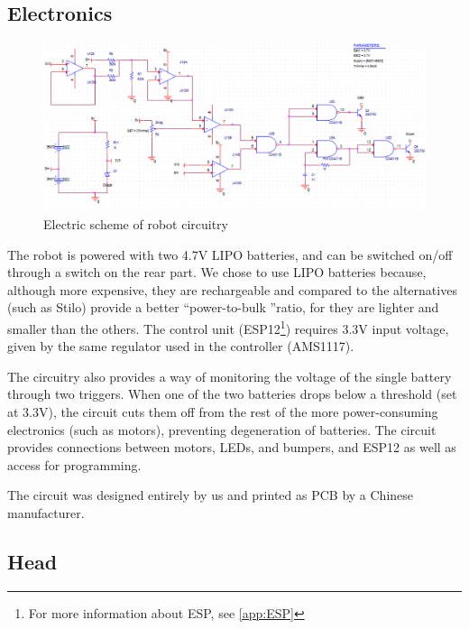 \documentclass[a4paper,twoside]{book}
\begin{document}
\subsection{Electronics}

\begin{figure}[h]
\includegraphics[width=\textwidth]{img/ProgettoCircuito.eps}
\caption{Electric scheme of robot circuitry}
\label{fig:robot_circ}
\end{figure}

The robot is powered with two 4.7V LIPO batteries, and can be switched on/off through a switch on the rear part. We chose to use LIPO batteries because, although more expensive, they are rechargeable and \textemdash compared to the alternatives (such as Stilo) \textemdash provide a better \textquotedblleft power-to-bulk \textquotedblright ratio, for they are lighter and smaller than the others.
The control unit (ESP12\footnote{For more information about ESP, see \autoref{app:ESP}}) requires 3.3V input voltage, given by the same regulator used in the controller (AMS1117).

The circuitry also provides a way of monitoring the voltage of the single battery through two triggers. When one of the two batteries drops below a threshold (set at 3.3V), the circuit cuts them off from the rest of the more power-consuming electronics (such as motors), preventing degeneration of batteries. The circuit provides connections between motors, LEDs, and bumpers, and ESP12 as well as access for programming.

The circuit was designed entirely by us and printed as PCB by a Chinese manufacturer.

\subsection{Head}
\end{document}
